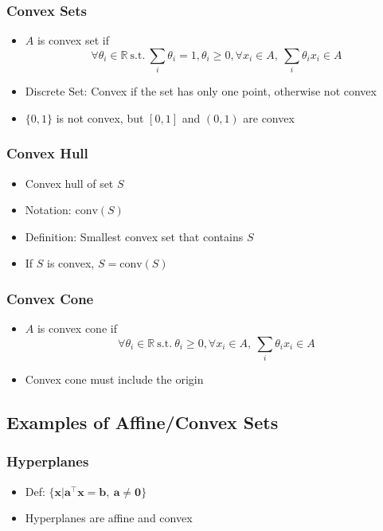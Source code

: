 \subsubsection*{Convex Sets}
\begin{itemize}
    \item $A$ is convex set if
    \begin{equation}
        \forall \theta_i \in \mathbb{R}~\mathrm{s.t.}~\sum_i \theta_i = 1, \theta_i \geq 0,\forall x_i \in A,~\sum_i \theta_i x_i \in A
    \end{equation}
    \item Discrete Set: Convex if the set has only one point, otherwise not convex
    \item $\{0,1\}$ is not convex, but $[0,1]$ and $(0,1)$ are convex
\end{itemize}

\subsubsection*{Convex Hull}
\begin{itemize}
    \item Convex hull of set $S$
    \item Notation: $\mathrm{conv}(S)$
    \item Definition: Smallest convex set that contains $S$
    \item If $S$ is convex, $S = \mathrm{conv}(S)$
\end{itemize}

\subsubsection*{Convex Cone}
\begin{itemize}
    \item $A$ is convex cone if
    \begin{equation}
        \forall \theta_i \in \mathbb{R}~\mathrm{s.t.}~\theta_i \geq 0,\forall x_i \in A,~\sum_i \theta_i x_i \in A
    \end{equation}
    \item Convex cone must include the origin
\end{itemize}

\subsection{Examples of Affine/Convex Sets}

\subsubsection*{Hyperplanes}
\begin{itemize}
    \item Def: $\{\mathbf{x}|\mathbf{a}^{\top}\mathbf{x} = \mathbf{b},~\mathbf{a} \neq \mathbf{0}\}$
    \item Hyperplanes are affine and convex
\end{itemize}

